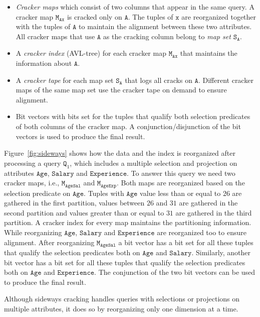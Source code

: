 \begin{itemize}
\item \emph{Cracker maps} which consist of two columns that appear in the same query. 
A cracker map $\mathtt{M_{Ax}}$ is cracked only on $\mathtt{A}$.
The tuples of $\mathtt{x}$ are reorganized together with the tuples of
$\mathtt{A}$ to maintain the alignment between these two attributes.
All cracker maps that use $\mathtt{A}$ as the cracking column belong to 
\emph{map set $\mathtt{S_A}$}. 
\item A \emph{cracker index} (AVL-tree) for each cracker map $\mathtt{M_{Ax}}$ that maintains the information about $\mathtt{A}$.
\item A \emph{cracker tape} for each map set $\mathtt{S_A}$ that logs all cracks on $\mathtt{A}$.
Different cracker maps of the same map set use the cracker tape on demand to ensure alignment.
\item Bit vectors with bits set for the tuples that qualify both selection predicates of both columns of the cracker map.
A conjunction/disjunction of the bit vectors is used to produce the final result.
\end{itemize}

Figure~\ref{fig:sideways} shows how the data and the index is reorganized after
processing a query $\mathtt{Q_{1}}$, which includes a multiple selection and projection
on attributes $\mathtt{Age}$, $\mathtt{Salary}$ and $\mathtt{Experience}$.
To answer this query we need two cracker maps, i.e., $\mathtt{M_{AgeSal}}$ and $\mathtt{M_{AgeExp}}$.
Both maps are reorganized based on the selection predicate on $\mathtt{Age}$.
Tuples with $\mathtt{Age}$ value less than or equal to $26$ are gathered in the
first partition, values between $26$ and $31$ are gathered in the second
partition and values greater than or equal to $31$ are gathered in the third partition.
A cracker index for every map maintains the partitioning information.
While reorganizing $\mathtt{Age}$, $\mathtt{Salary}$ and $\mathtt{Experience}$ are reorganized too to ensure alignment.
After reorganizing $\mathtt{M_{AgeSal}}$ a bit vector has a bit set for all these tuples that qualify the selection predicates both on $\mathtt{Age}$ and $\mathtt{Salary}$.
Similarly, another bit vector has a bit set for all these tuples that qualify the selection predicates both on $\mathtt{Age}$ and $\mathtt{Experience}$.
The conjunction of the two bit vectors can be used to produce the final result.

Although sideways cracking handles queries with selections or projections on multiple attributes, it does so by reorganizing only one dimension at a time.
